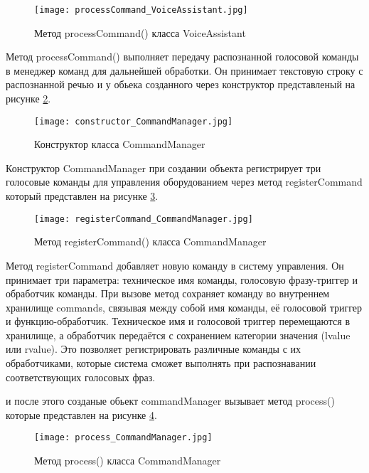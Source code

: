 \begin{figure}[H]
	\centering
	\texttt{[image: processCommand\_VoiceAssistant.jpg]}
	\caption{Метод processCommand()  класса VoiceAssistant}
	\label{fig:processCommand_VoiceAssistant}
\end{figure}

Метод processCommand() выполняет передачу распознанной голосовой команды в менеджер команд для дальнейшей обработки. Он принимает текстовую строку с распознанной речью и у обьека созданного через конструктор представленый на рисунке \ref{fig:constructor_CommandManager}.


\begin{figure}[H]
	\centering
	\texttt{[image: constructor\_CommandManager.jpg]}
	\caption{Конструктор класса CommandManager}
	\label{fig:constructor_CommandManager}
\end{figure}

Конструктор CommandManager при создании объекта регистрирует три голосовые команды для управления оборудованием через метод registerCommand который представлен на рисунке \ref{fig:registerCommand_CommandManager}.

\begin{figure}[H]
	\centering
	\texttt{[image: registerCommand\_CommandManager.jpg]}
	\caption{Метод registerCommand()  класса CommandManager}
	\label{fig:registerCommand_CommandManager}
\end{figure}

Метод registerCommand добавляет новую команду в систему управления. Он принимает три параметра: техническое имя команды, голосовую фразу-триггер и обработчик команды. При вызове метод сохраняет команду во внутреннем хранилище commands, связывая между собой имя команды, её голосовой триггер и функцию-обработчик. Техническое имя и голосовой триггер перемещаются в хранилище, а обработчик передаётся с сохранением категории значения (lvalue или rvalue). Это позволяет регистрировать различные команды с их обработчиками, которые система сможет выполнять при распознавании соответствующих голосовых фраз.

 и после этого созданые обьект commandManager вызывает метод process() которые представлен на рисунке \ref{fig:process_CommandManager}.

\begin{figure}[H]
	\centering
	\texttt{[image: process\_CommandManager.jpg]}
	\caption{Метод process()  класса CommandManager}
	\label{fig:process_CommandManager}
\end{figure}

